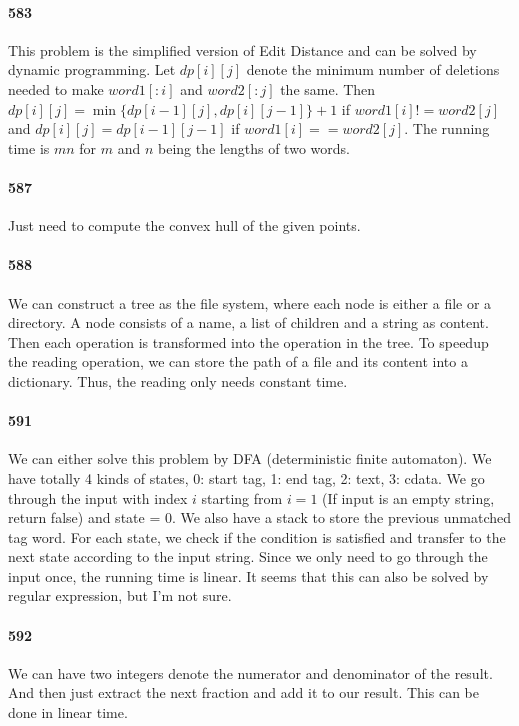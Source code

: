 \documentclass[11pt]{article}
\begin{document}
\begin{itemize}
\paragraph{583}
This problem is the simplified version of Edit Distance and can be solved by dynamic programming. Let $dp[i][j]$ denote the 
minimum number of deletions needed to make $word1[:i]$ and $word2[:j]$ the same. Then $dp[i][j] = \min \{ dp[i-1][j], 
dp[i][j-1] \} + 1$ if $word1[i] != word2[j]$ and $dp[i][j] = dp[i-1][j-1]$ if $word1[i] == word2[j]$. 
The running time is $mn$ for $m$ and $n$ being the lengths of two words.

\paragraph{587}
Just need to compute the convex hull of the given points.

\paragraph{588}
We can construct a tree as the file system, where each node is either a file or a directory. 
A node consists of a name, a list of children and a string as content. 
Then each operation is transformed into the operation in the tree. 
To speedup the reading operation, we can store the path of a file and its content into a dictionary.
Thus, the reading only needs constant time. 

\paragraph{591}
We can either solve this problem by DFA (deterministic finite automaton). 
We have totally 4 kinds of states, 0: start tag, 1: end tag, 2: text, 3: cdata.
We go through the input with index $i$ starting from $i=1$ (If input is an empty string, return false) and state = 0.
We also have a stack to store the previous unmatched tag word.
For each state, we check if the condition is satisfied and transfer to the next state according to the input string.
Since we only need to go through the input once, the running time is linear.
It seems that this can also be solved by regular expression, but I'm not sure.

\paragraph{592}
We can have two integers denote the numerator and denominator of the result. And then just extract the next fraction and add
it to our result. This can be done in linear time. 


\end{itemize}
\end{document}
